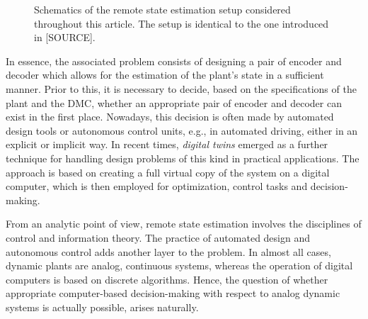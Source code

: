 \documentclass[conference]{IEEEtran}
\newcommand{\rxs}{(\mathsf{x}_t)_{t\in\NN}}
\newcommand{\rys}{(\mathsf{y}_t)_{t\in\NN}}
\newcommand{\rshs}{(\hat{\mathsf{s}}_t)_{t\in\NN}}
\def\E{{\mathcal E}}
\def\D{{\mathcal D}}
\def\NN{{\mathbb N}}
\newcommand{\sdummy}{{\color{red}[SOURCE]}}
\begin{document}
\begin{figure}
		\caption{Schematics of the remote state estimation setup considered throughout this article. The setup is identical to the one introduced in \sdummy.}
		\label{fig:Schematics}
	\end{figure}
	
	In essence, the associated problem consists of designing a pair of encoder and decoder which allows for the estimation of the plant's state in a sufficient manner. 
	Prior to this, it is necessary to decide, based on the specifications of the plant and the DMC, whether an appropriate pair of encoder and decoder can exist in the first place. 
	Nowadays, this decision is often made by automated design tools or autonomous control units, e.g., in automated driving, either in an explicit or implicit way. In recent times, 
	\emph{digital twins} emerged as a further technique for handling design problems of this kind in practical applications. The approach is based on creating a full virtual copy of 
	the system on a digital computer, which is then employed for optimization, control tasks and decision-making. 

	From an analytic point of view, remote state estimation involves the disciplines of control and information theory. 
	The practice of automated design and autonomous control adds another layer to the problem. In almost all cases, dynamic plants are analog, continuous  systems, 
	whereas the operation of digital computers is based on discrete algorithms. Hence, the question of whether appropriate computer-based decision-making with respect to analog 
	dynamic systems is actually possible, arises naturally. 
\end{document}
